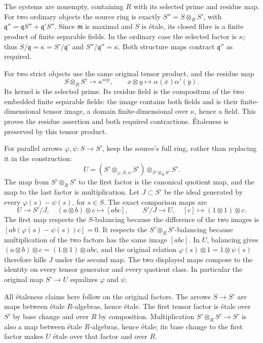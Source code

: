 The systems are nonempty, containing \(R\) with its selected prime and residue map. For two ordinary objects the source ring is exactly \(S''=S\otimes_R S'\), with \(\mathfrak q''=\mathfrak qS''+\mathfrak q'S''\). Since \(\mathfrak m\) is maximal and \(S\) is étale, its closed fibre is a finite product of finite separable fields. In the ordinary case the selected factor is \(\kappa\); thus \(S/\mathfrak q=\kappa=S'/\mathfrak q'\) and \(S''/\mathfrak q''=\kappa\). Both structure maps contract \(\mathfrak q''\) as required.

For two strict objects use the same original tensor product, and the residue map \[
 S\otimes_R S'\longrightarrow\kappa^{sep},\qquad
 x\otimes y\longmapsto\alpha(\overline x)\alpha'(\overline y).
\] Its kernel is the selected prime. Its residue field is the compositum of the two embedded finite separable fields: the image contains both fields and is their finite-dimensional tensor image, a domain finite-dimensional over \(\kappa\), hence a field. This proves the residue assertion and both required contractions. Étaleness is preserved by this tensor product.

For parallel arrows \(\varphi,\psi:S\to S'\), keep the source's full ring, rather than replacing it in the construction: \[
 U=(S'\otimes_{\varphi,S,\psi}S')\otimes_{S'\otimes_R S'}S'.
\] The map from \(S'\otimes_R S'\) to the first factor is the canonical quotient map, and the map to the last factor is multiplication. Let \(J\subset S'\) be the ideal generated by every \(\varphi(s)-\psi(s)\), for \(s\in S\). The exact comparison maps are \[
 U\longrightarrow S'/J,\quad (a\otimes b)\otimes c\longmapsto[abc],
 \qquad
 S'/J\longrightarrow U,\quad[c]\longmapsto(1\otimes1)\otimes c.
\] The first map respects the \(S\)-balancing because the difference of the two images is \([ab(\varphi(s)-\psi(s))c]=0\). It respects the \(S'\otimes_R S'\)-balancing because multiplication of the two factors has the same image \([abc]\). In \(U\), balancing gives \((a\otimes b)\otimes c=(1\otimes1)\otimes abc\), and the original relation \(\varphi(s)\otimes1=1\otimes\psi(s)\) therefore kills \(J\) under the second map. The two displayed maps compose to the identity on every tensor generator and every quotient class. In particular the original map \(S'\to U\) equalizes \(\varphi\) and \(\psi\).

All étaleness claims here follow on the original factors. The arrows \(S\to S'\) are maps between étale \(R\)-algebras, hence étale. The first tensor factor is étale over \(S'\) by base change and over \(R\) by composition. Multiplication \(S'\otimes_R S'\to S'\) is also a map between étale \(R\)-algebras, hence étale; its base change to the first factor makes \(U\) étale over that factor and over \(R\).

